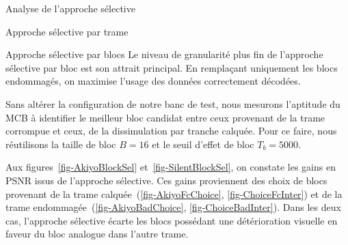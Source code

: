 \begin{section}{Analyse de l'approche sélective}
\begin{subsection}{Approche sélective par trame}
\FloatBarrier
\end{subsection}
\begin{subsection}{Approche sélective par blocs}
\label{sec-AnalyseMCB}
Le niveau de granularité plus fin de l’approche sélective par bloc est son
attrait principal. En remplaçant uniquement les blocs endommagés, on maximise
l’usage des données correctement décodées.

Sans altérer la configuration de notre banc de test, nous mesurons l'aptitude du
MCB à identifier le meilleur bloc candidat entre ceux provenant de la trame
corrompue et ceux, de la dissimulation par tranche calquée. Pour ce faire, nous
réutilisons la taille de bloc $B=16$ et le seuil d'effet de bloc $T_b = 5000$.

Aux figures~\ref{fig-AkiyoBlockSel} et~\ref{fig-SilentBlockSel}, on constate
les gains en PSNR issus de l'approche sélective. Ces gains proviennent des
choix de blocs provenant de la trame calquée~(\ref{fig-AkiyoFcChoice},
\ref{fig-ChoiceFcInter}) et de la trame endommagée~(\ref{fig-AkiyoBadChoice},
\ref{fig-ChoiceBadInter}). Dans les deux cas, l'approche sélective écarte les
blocs possédant une détérioration visuelle en faveur du bloc analogue dans
l'autre trame.


\end{subsection}
\end{section}
